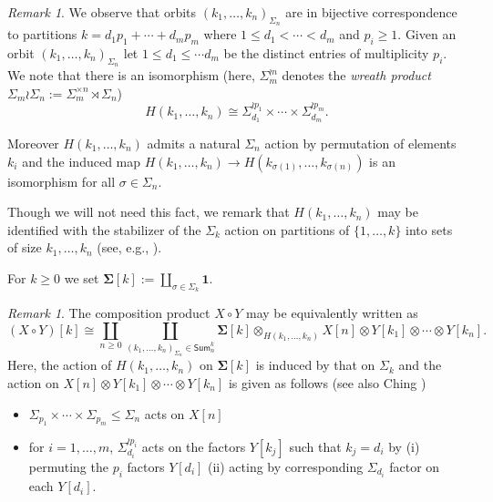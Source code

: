 \documentclass[11pt]{amsart}
\theoremstyle{definition}
\theoremstyle{remark}
\newtheorem{remark}[subsection]{Remark}
\begin{document}
\begin{remark} 
    We observe that orbits $(k_1,\dots,k_n)_{\Sigma_n}$ are in bijective correspondence to partitions $k=d_1p_1+\cdots+d_mp_m$ where $1\leq d_1<\cdots<d_m$ and $p_i\geq 1$. Given an orbit $(k_1,\dots,k_n)_{\Sigma_n}$ let $1\leq d_1\leq \cdots d_m$ be the distinct entries of multiplicity $p_i$. We note that there is an isomorphism (here, $\Sigma_m^{\wr n}$ denotes the \textit{wreath product} $\Sigma_m\wr \Sigma_n :=\Sigma_m^{\times n}\rtimes \Sigma_n$)
    \[H(k_1,\dots,k_n)\cong \Sigma_{d_1}^{\wr p_1}\times\cdots \times \Sigma_{d_m}^{\wr p_m}.\] 
    
    Moreover $H(k_1,\dots,k_n)$ admits a natural $\Sigma_n$ action by permutation of elements $k_i$ and the induced map $H(k_1,\dots,k_n) \to H(k_{\sigma(1)},\dots, k_{\sigma(n)})$ is an isomorphism for all $\sigma\in \Sigma_n$.\end{remark} 
    
    Though we will not need this fact, we remark that $H(k_1,\dots,k_n)$ may be identified with the stabilizer of the $\Sigma_k$ action on partitions of $\{1,\dots,k\}$ into sets of size $k_1,\dots,k_n$ (see, e.g.,  \cite[]{Ching-chain-rule}).

For $k\geq 0$ we set $\mathbf{\Sigma}[k]:=\coprod_{\sigma\in \Sigma_k} \mathbf{1}$.

\begin{remark} The composition product $X\circ Y$ may be equivalently written as \begin{equation} \label{comp-prod-def-orb} 
    (X{\circ} Y)[k]\cong \coprod_{n\geq 0} \coprod_{(k_1,\dots,k_n)_{\Sigma_n}\in \mathsf{Sum}_n^k} \mathbf{\Sigma}[k] \otimes_{H(k_1,\dots,k_n)} X[n] \otimes Y[k_1]\otimes \cdots \otimes Y[k_n].
\end{equation}
Here, the  action of $H(k_1,\dots,k_n)$ on $\mathbf{\Sigma}[k]$ is induced by that on $\Sigma_k$ and the action on $X[n]\otimes Y[k_1] \otimes \cdots \otimes Y[k_n]$ is given as follows (see also Ching \cite[1.13]{Ching-chain-rule})
\begin{itemize}
    \item $\Sigma_{p_1}\times \cdots \times \Sigma_{p_m}\leq \Sigma_n$ acts on $X[n]$ 
    \item for $i=1,\dots,m$, $\Sigma_{d_i}^{\wr p_i}$ acts on the factors $Y[k_j]$ such that $k_j=d_i$ by
    \subitem (i) permuting the $p_i$ factors $Y[d_i]$  
    \subitem (ii) acting by corresponding $\Sigma_{d_i}$ factor on each $Y[d_i]$. 
\end{itemize}
\end{remark}
\end{document}
